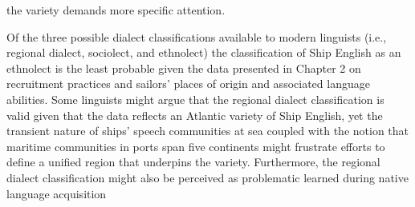the variety demands more specific attention. 

Of the three possible dialect classifications available to modern linguists (i.e., regional dialect, sociolect, and ethnolect) the classification of Ship English as an ethnolect is the least probable given the data presented in Chapter 2 on recruitment practices and sailors’ places of origin and associated language abilities. Some linguists might argue that the regional dialect classification is valid given that the data reflects an Atlantic variety of Ship English, yet the transient nature of ships’ speech communities at sea coupled with the notion that maritime communities in ports span five continents might frustrate efforts to define a unified region that underpins the variety. Furthermore, the regional dialect classification might also be perceived as problematic  learned during native language acquisition 

